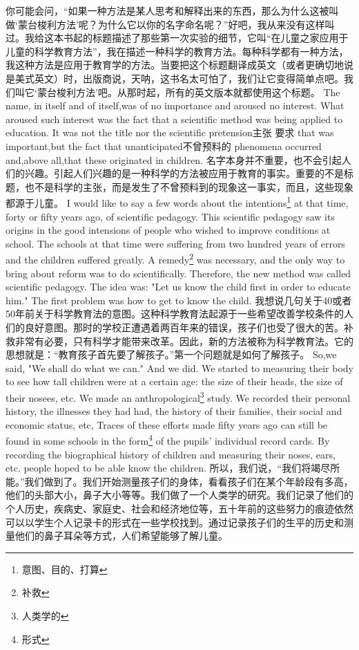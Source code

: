 \documentclass[lang=cn,10pt]{elegantbook}
\begin{document}
你可能会问，“如果一种方法是某人思考和解释出来的东西，那么为什么这被叫做‘蒙台梭利方法’呢？为什么它以你的名字命名呢？”好吧，我从来没有这样叫过。我给这本书起的标题描述了那些第一次实验的细节，它叫“在儿童之家应用于儿童的科学教育方法”，我在描述一种科学的教育方法。每种科学都有一种方法，我这种方法是应用于教育学的方法。当要把这个标题翻译成英文（或者更确切地说是美式英文）时，出版商说，天呐，这书名太可怕了，我们让它变得简单点吧。我们叫它‘蒙台梭利方法’吧。从那时起，所有的英文版本就都使用这个标题。
The name, in itself and of itself,was of no importance and aroused no interest. What aroused such interest was the fact that a scientific method was being applied to education. It was not the title nor the scientific pretension主张 要求 that was important,but the fact that unanticipated不曾预料的 phenomena occurred and,above all,that these originated in children.
名字本身并不重要，也不会引起人们的兴趣。引起人们兴趣的是一种科学的方法被应用于教育的事实。重要的不是标题，也不是科学的主张，而是发生了不曾预料到的现象这一事实，而且，这些现象都源于儿童。
I would like to say a few words about the intentions\footnote{意图、目的、打算} at that time, forty or fifty years ago, of scientific pedagogy. This scientific pedagogy saw its origins in the good intensions of people who wished to improve conditions at school. The schools at that time were suffering from two hundred years of errors and the children suffered greatly. A remedy\footnote{补救} was necessary, and the only way to bring about reform was to do scientifically. Therefore, the new method was called scientific pedagogy. The idea was: "Let us know the child first in order to educate him." The first problem was how to get to know the child.
我想说几句关于40或者50年前关于科学教育法的意图。这种科学教育法起源于一些希望改善学校条件的人们的良好意图。那时的学校正遭遇着两百年来的错误，孩子们也受了很大的苦。补救非常有必要，只有科学才能带来改革。因此，新的方法被称为科学教育法。它的思想就是：“教育孩子首先要了解孩子。”第一个问题就是如何了解孩子。
So,we said, "We shall do what we can." And we did. We started to measuring their body to see how tall children were at a certain age: the size of their heads, the size of their nosees, etc. We made an anthropological\footnote{人类学的} study. We recorded their personal history, the illnesses they had had, the history of their families, their social and economic status, etc, Traces of these efforts made fifty years ago can still be found in some schools in the form\footnote{形式} of the pupils' individual record cards. By recording the biographical history of children and measuring their noses, ears, etc. people hoped to be able know the children.
所以，我们说，“我们将竭尽所能。”我们做到了。我们开始测量孩子们的身体，看看孩子们在某个年龄段有多高，他们的头部大小，鼻子大小等等。我们做了一个人类学的研究。我们记录了他们的个人历史，疾病史、家庭史、社会和经济地位等，五十年前的这些努力的痕迹依然可以以学生个人记录卡的形式在一些学校找到。通过记录孩子们的生平的历史和测量他们的鼻子耳朵等方式，人们希望能够了解儿童。
\end{document}
